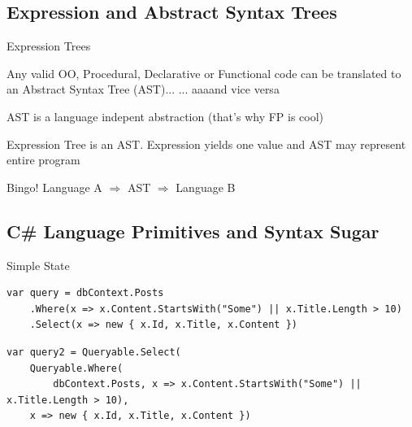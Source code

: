 \documentclass{bredelebeamer}
\begin{document}
\subsection{Expression and Abstract Syntax Trees}
\begin{frame}{Expression Trees}
    \begin{block}{Any valid OO, Procedural, Declarative or Functional code}
        can be translated to an Abstract Syntax Tree (AST)...
        \pause  ... aaaand vice versa
    \end{block}
    \pause
    \begin{block}{AST}
        is a language indepent abstraction \pause (that's why FP is cool)
    \end{block}
    \pause
    \begin{block}{Expression Tree}
        is an AST. Expression yields one value and AST may represent entire program
    \end{block}
    
    \begin{exampleblock}{Bingo!}
        Language A $\Rightarrow$ AST $\Rightarrow$ Language B
    \end{exampleblock}

\end{frame}
\subsection{C\# Language Primitives and Syntax Sugar}
\begin{frame}[fragile]{Simple State}
    \begin{lstlisting}
var query = dbContext.Posts
    .Where(x => x.Content.StartsWith("Some") || x.Title.Length > 10)
    .Select(x => new { x.Id, x.Title, x.Content })
    \end{lstlisting}
    \pause
    \begin{lstlisting}
var query2 = Queryable.Select(
    Queryable.Where(
        dbContext.Posts, x => x.Content.StartsWith("Some") || x.Title.Length > 10),
    x => new { x.Id, x.Title, x.Content })
    \end{lstlisting}
\end{frame}
\end{document}
